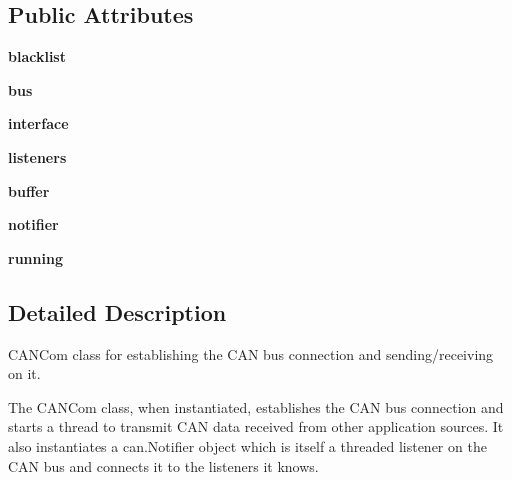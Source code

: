 \subsection*{Public Attributes}
\begin{DoxyCompactItemize}
\item 
{\bfseries blacklist}\hypertarget{classracecontrol_1_1cancom_1_1CANCom_a18b61f0fb38913869153e6d9d29722e5}{}\label{classracecontrol_1_1cancom_1_1CANCom_a18b61f0fb38913869153e6d9d29722e5}

\item 
{\bfseries bus}\hypertarget{classracecontrol_1_1cancom_1_1CANCom_a0d02fccc3ae1db96edf0ab37a63642ea}{}\label{classracecontrol_1_1cancom_1_1CANCom_a0d02fccc3ae1db96edf0ab37a63642ea}

\item 
{\bfseries interface}\hypertarget{classracecontrol_1_1cancom_1_1CANCom_a57730a29aa159916aaba10d8bef3e2f4}{}\label{classracecontrol_1_1cancom_1_1CANCom_a57730a29aa159916aaba10d8bef3e2f4}

\item 
{\bfseries listeners}\hypertarget{classracecontrol_1_1cancom_1_1CANCom_ab5609d47b9144f9d53a71273d03deec6}{}\label{classracecontrol_1_1cancom_1_1CANCom_ab5609d47b9144f9d53a71273d03deec6}

\item 
{\bfseries buffer}\hypertarget{classracecontrol_1_1cancom_1_1CANCom_ab2666668b9d321a5659448b044c8b607}{}\label{classracecontrol_1_1cancom_1_1CANCom_ab2666668b9d321a5659448b044c8b607}

\item 
{\bfseries notifier}\hypertarget{classracecontrol_1_1cancom_1_1CANCom_a13c3f606fc3ee8bafd78b2694d3133c4}{}\label{classracecontrol_1_1cancom_1_1CANCom_a13c3f606fc3ee8bafd78b2694d3133c4}

\item 
{\bfseries running}\hypertarget{classracecontrol_1_1cancom_1_1CANCom_ad505d0df53d256b1d534952b07e10f63}{}\label{classracecontrol_1_1cancom_1_1CANCom_ad505d0df53d256b1d534952b07e10f63}

\end{DoxyCompactItemize}


\subsection{Detailed Description}
\begin{DoxyVerb}CANCom class for establishing the CAN bus connection and
sending/receiving on it.

The CANCom class, when instantiated, establishes the CAN bus connection and
starts a thread to transmit CAN data received from other application
sources. It also instantiates a can.Notifier object which is itself a
threaded listener on the CAN bus and connects it to the listeners it knows.
\end{DoxyVerb}
 

